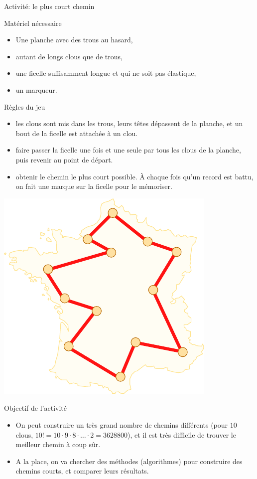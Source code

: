 \begin{frame}{Activité: le plus court chemin}
  
  \begin{block}{Matériel nécessaire}
    \begin{itemize}
    \item Une planche avec des trous au hasard,
    \item autant de longs clous que de trous,
    \item une ficelle suffisamment longue et \alert{qui ne soit pas élastique},
    \item un marqueur.
    \end{itemize}
  \end{block}

  \begin{block}{Règles du jeu}
    \begin{itemize}
    \item {} les clous sont mis dans les trous, leurs têtes dépassent de la planche, et un bout de la ficelle est attachée à un clou.
    \item {} faire passer la ficelle \alert{une fois et une seule} par \alert{tous les clous} de la planche, puis revenir au point de départ.
    \item  {} obtenir le chemin le plus court possible. À chaque fois qu'un record est battu, on fait une marque sur la ficelle pour le mémoriser.
    \end{itemize}
  \end{block}

  \begin{center}
    \includegraphics[width=0.3\linewidth]{img/tsp.pdf}
    \label{img:tsp}
  \end{center}

  \begin{block}{Objectif de l'activité}
    \begin{itemize}
    \item On peut construire un très grand nombre de chemins différents (pour $10$ clous, $10! = 10 \cdot 9 \cdot 8 \cdot \ldots \cdot 2 = 3628800$), et il est très difficile de trouver le meilleur chemin à coup sûr.
    \item A la place, on va chercher des méthodes (algorithmes) pour construire des chemins courts, et comparer leurs résultats.
    \end{itemize}
  \end{block}

\end{frame}

